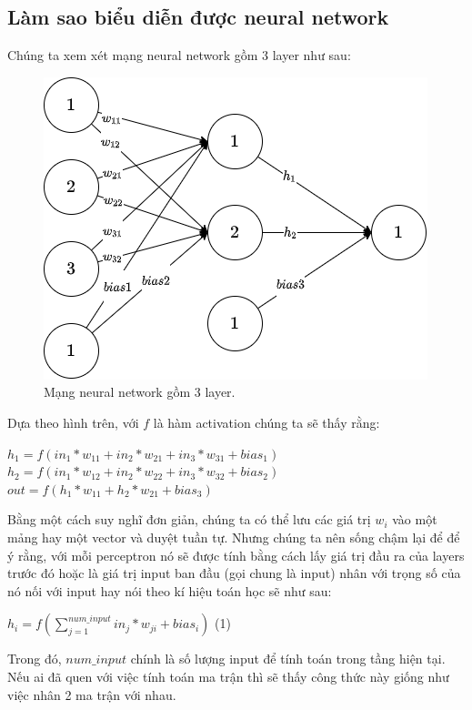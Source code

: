 \subsection{Làm sao biểu diễn được neural network}
Chúng ta xem xét mạng neural network gồm 3 layer như sau: 
\begin{figure}[!h]
	\centering
		\includegraphics[width=0.5\columnwidth]{chapter03/figure/weight(1).png}
        \caption{Mạng neural network gồm 3 layer.}
        \label{fig:weight}
		\centering
\end{figure}

Dựa theo hình trên, với $f$ là hàm activation chúng ta sẽ thấy rằng:
\begin{center}
$h_{1} = f(in_{1}*w_{11}+in_{2}*w_{21}+in_{3}*w_{31}+bias_{1})$\\
$h_{2} = f(in_{1}*w_{12}+in_{2}*w_{22}+in_{3}*w_{32}+bias_{2})$\\
$out = f(h_{1}*w_{11}+h_{2}*w_{21}+bias_{3})$\\
\end{center}

Bằng một cách suy nghĩ đơn giản, chúng ta có thể lưu các giá trị $w_{i}$ vào một mảng hay một vector và duyệt tuần tự. Nhưng chúng ta nên sống chậm lại để để ý rằng, với mỗi perceptron nó sẽ được tính bằng cách lấy giá trị đầu ra của layers trước đó hoặc là giá trị input ban đầu (gọi chung là input) nhân với trọng số của nó nối với input hay nói theo kí hiệu toán học sẽ như sau:
\begin{center}
    $h_{i} = f(\sum_{j=1}^{num\_input} in_{j}*w_{ji}+bias_{i})$ (1)
\end{center}

Trong đó, $num\_input$ chính là số lượng input để tính toán trong tầng hiện tại. Nếu ai đã quen với việc tính toán ma trận thì sẽ thấy công thức này giống như việc nhân 2 ma trận với nhau.


